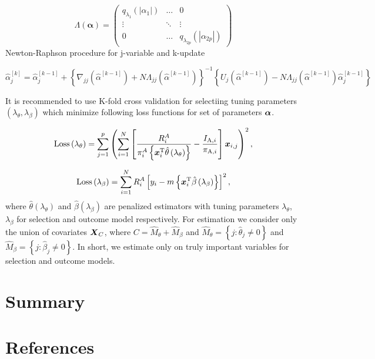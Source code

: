 \documentclass[
  letterpaper,
  DIV=11,
  numbers=noendperiod]{scrreprt}
\begin{document}
\[
\Lambda(\boldsymbol{\alpha})=\left(\begin{array}{ccc}
q_{\lambda_1}\left(\left|\alpha_1\right|\right) & \ldots & 0 \\
\vdots & \ddots & \vdots \\
0 & \ldots & q_{\lambda_{2 p}}\left(\left|\alpha_{2 p}\right|\right)
\end{array}\right)
\] Newton-Raphson procedure for j-variable and k-update

\[
\hat{\alpha}_j^{[k]}=\hat{\alpha}_j^{[k-1]}+\left\{\nabla_{j j}\left(\hat{\alpha}^{[k-1]}\right)+N \Lambda_{j j}\left(\hat{\alpha}^{[k-1]}\right)\right\}^{-1}\left\{U_j\left(\hat{\alpha}^{[k-1]}\right)-N \Lambda_{j j}\left(\hat{\alpha}^{[k-1]}\right) \hat{\alpha}_j^{[k-1]}\right\}
\]

It is recommended to use K-fold cross validation for selectiing tuning
parameters \(\left(\lambda_{\theta}, \lambda_{\beta}\right)\) which
minimize following loss functions for set of parameters \(\boldsymbol{\alpha}\).

\[
\operatorname{Loss}\left(\lambda_\theta\right)=\sum_{j=1}^p\left(\sum_{i=1}^N\left[\frac{R_i^A}{\pi_i^A\left\{\boldsymbol{x}_i^{\mathrm{T}} \hat{\theta}\left(\lambda_\theta\right)\right\}}-\frac{I_{\mathrm{A}, i}}{\pi_{\mathrm{A}, i}}\right] \boldsymbol{x}_{i, j}\right)^2,
\]

\[
\operatorname{Loss}\left(\lambda_\beta\right)=\sum_{i=1}^N R_i^A\left[y_i-m\left\{\boldsymbol{x}_i^{\mathrm{T}} \hat{\beta}\left(\lambda_\beta\right)\right\}\right]^2,
\] where \(\hat{\theta}\left(\lambda_\theta\right)\) and
\(\hat{\beta}\left(\lambda_\beta\right)\) are penalized estimators with
tuning parameters \(\lambda_\theta\), \(\lambda_\beta\) for selection
and outcome model respectively. For estimation we consider only the
union of covariates \(\boldsymbol{X}_C\), where
\(C = \hat{M}_{\theta} + \hat{M}_{\beta}\) and
\(\hat{M}_{\theta} = \left\{j: \hat{\theta}_j \ne 0\right\}\) and
\(\hat{M}_{\beta} = \left\{j: \hat{\beta}_j \ne 0\right\}\). In short,
we estimate only on truly important variables for selection and outcome
models.


\hypertarget{summary}{%
\chapter{Summary}\label{summary}}


\hypertarget{references}{%
\chapter{References}\label{references}}
\end{document}
